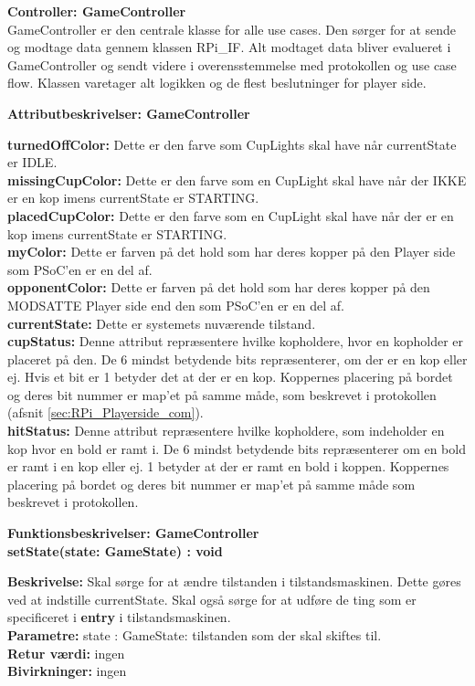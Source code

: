 \documentclass[Arkitektur/System_main.tex]{subfiles}
\begin{document}
{\large\textbf{Controller:  GameController}}\\
GameController er den centrale klasse for alle use cases. Den sørger for at sende og modtage data gennem klassen RPi\_IF. Alt modtaget data bliver evalueret i GameController og sendt videre i overensstemmelse med protokollen og use case flow. Klassen varetager alt logikken og de flest beslutninger for player side. 

{\large\textbf{Attributbeskrivelser: GameController}}
\begin{adjustwidth}{1cm}{0pt}
\textbf{turnedOffColor:} Dette er den farve som CupLights skal have når currentState er IDLE. \\[0.2cm]
\textbf{missingCupColor:} Dette er den farve som en CupLight skal have når der IKKE er en kop imens currentState er STARTING. \\[0.2cm]
\textbf{placedCupColor:} Dette er den farve som en CupLight skal have når der er en kop imens currentState er STARTING. \\[0.2cm]
\textbf{myColor:} Dette er farven på det hold som har deres kopper på den Player side som PSoC'en er en del af.\\[0.2cm]
\textbf{opponentColor:} Dette er farven på det hold som har deres kopper på den MODSATTE Player side end den som PSoC'en er en del af.\\[0.2cm]
\textbf{currentState:} Dette er systemets nuværende tilstand.\\[0.2cm]
\textbf{cupStatus:} Denne attribut repræsentere hvilke kopholdere, hvor en kopholder er placeret på den. De 6 mindst betydende bits repræsenterer, om der er en kop eller ej. Hvis et bit er 1 betyder det at der er en kop. Koppernes placering på bordet og deres bit nummer er map'et på samme måde, som beskrevet i protokollen (afsnit \ref{sec:RPi_Playerside_com}). \\[0.2cm] 
\textbf{hitStatus:} Denne attribut repræsentere hvilke kopholdere, som indeholder en kop hvor en bold er ramt i. De 6 mindst betydende bits repræsenterer om en bold er ramt i en kop eller ej. 1 betyder at der er ramt en bold i koppen. Koppernes placering på bordet og deres bit nummer er map'et på samme måde som beskrevet i protokollen. \\[0.2cm]

\end{adjustwidth}


    {\large\textbf{Funktionsbeskrivelser: GameController}}\\[0.2cm]
    \textbf{setState(state: GameState) : void}
    \begin{adjustwidth}{1cm}{0pt}
    \textbf{Beskrivelse:} Skal sørge for at ændre tilstanden i tilstandsmaskinen. Dette gøres ved at indstille currentState. Skal også sørge for at udføre de ting som er specificeret i \textbf{entry} i tilstandsmaskinen. \\[0.2cm]
    \textbf{Parametre:} state : GameState: tilstanden som der skal skiftes til. \\[0.2cm]
    \textbf{Retur værdi:} ingen \\[0.2cm]
    \textbf{Bivirkninger:} ingen \\[0.2cm]
    \end{adjustwidth}
    
\end{document}
